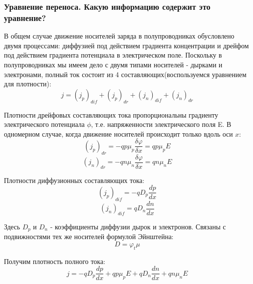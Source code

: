 \subsubsection{Уравнение переноса. Какую информацию содержит это уравнение?}

В общем случае движение носителей заряда в полупроводниках обусловлено двумя процессами: диффузией под действием градиента концентрации и дрейфом под действием градиента потенциала в электрическом поле. Поскольку в полупроводниках мы имеем дело с двумя типами носителей - дырками и электронами, полный ток состоит из 4 составляющих(воспользуемся уравнением для плотности):
$$
j = (j_p)_{dif} + (j_p)_{dr} + (j_n)_{dif} + (j_n)_{dr} 
$$

Плотности дрейфовых составляющих тока пропорциональны градиенту электрического потенциала $\phi$, т.е. напряженности электрического поля E. В одномерном случае, когда движение носителей происходит только вдоль оси $x$:
$$
(j_p)_{dr} = -qp\mu_p\frac{\delta \varphi}{\delta x} = qp\mu_pE
$$
$$
(j_n)_{dr} = -qn\mu_n\frac{\delta \varphi}{\delta x} = qn\mu_nE
$$

Плотности диффузионных составляющих тока:
$$
(j_p)_{dif} = -qD_p\frac{dp}{dx}
$$
$$
(j_n)_{dif} = qD_n\frac{dn}{dx}
$$

Здесь $D_p$ и $D_n$ - коэффициенты диффузии дырок и электронов. Связаны с подвижностями тех же носителей формулой Эйнштейна:
$$
D = \varphi_t\mu
$$

Получим плотность полного тока:
$$
j = -qD_p\frac{dp}{dx} + qp\mu_pE + qD_n\frac{dn}{dx} + qn\mu_nE
$$
\pagebreak
